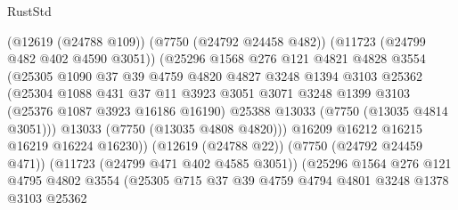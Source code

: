 \begin{lexlean}{RustStd}
\begin{coremodule}
                            (@12619 (@24788 @109))
                            (@7750 (@24792 @24458 @482))
                            (@11723 (@24799 @482 @402 @4590 @3051))
                            (@25296
                              @1568
                              @276
                              @121
                              @4821
                              @4828
                              @3554
                              (@25305
                                @1090
                                @37
                                @39
                                @4759
                                @4820
                                @4827
                                @3248
                                @1394
                                @3103
                                @25362
                                (@25304
                                  @1088
                                  @431
                                  @37
                                  @11
                                  @3923
                                  @3051
                                  @3071
                                  @3248
                                  @1399
                                  @3103
                                  (@25376 @1087 @3923 @16186 @16190)
                                  @25388
                                  @13033
                                  (@7750 (@13035 @4814 @3051)))
                                @13033
                                (@7750 (@13035 @4808 @4820)))
                              @16209
                              @16212
                              @16215
                              @16219
                              @16224
                              @16230))
                          (@12619 (@24788 @22))
                          (@7750 (@24792 @24459 @471))
                          (@11723 (@24799 @471 @402 @4585 @3051))
                          (@25296
                            @1564
                            @276
                            @121
                            @4795
                            @4802
                            @3554
                            (@25305
                              @715
                              @37
                              @39
                              @4759
                              @4794
                              @4801
                              @3248
                              @1378
                              @3103
                              @25362

\end{coremodule}
\end{lexlean}
